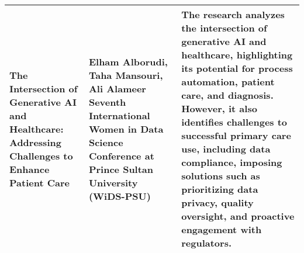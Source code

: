 \begin{table}[ht]
\begin{tabularx}{\textwidth}{@{} >{\raggedright\arraybackslash}p{3.5cm} >{\raggedright\arraybackslash}p{4.5cm} >{\raggedright\arraybackslash}X @{}}
\midrule
The Intersection of Generative AI and Healthcare: Addressing Challenges to Enhance Patient Care & Elham Alborudi, Taha Mansouri, Ali Alameer \newline 2024 Seventh International Women in Data Science Conference at Prince Sultan University (WiDS-PSU) & The research analyzes the intersection of generative AI and healthcare, highlighting its potential for process automation, patient care, and diagnosis. However, it also identifies challenges to successful primary care use, including data compliance, imposing solutions such as prioritizing data privacy, quality oversight, and proactive engagement with regulators. \\
\bottomrule
\end{tabularx}
\end{table}